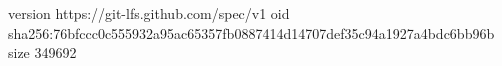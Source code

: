 version https://git-lfs.github.com/spec/v1
oid sha256:76bfccc0c555932a95ac65357fb0887414d14707def35c94a1927a4bdc6bb96b
size 349692
